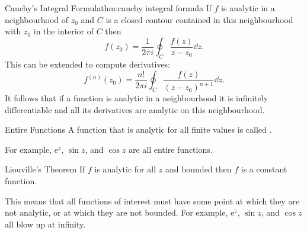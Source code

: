 \documentclass[fleqn]{NotesClass}
\newcommand*{\e}{\mathrm{e}}
\begin{document}
    \begin{thm}{Cauchy's Integral Formula}{thm:cauchy integral formula}
        If \(f\) is analytic in a neighbourhood of \(z_0\) and \(C\) is a closed contour contained in this neighbourhood with \(z_0\) in the interior of \(C\) then
        \begin{equation}
            f(z_0) = \frac{1}{2\pi i} \oint_C \frac{f(z)}{z - z_0}\dd{z}.
        \end{equation}
        This can be extended to compute derivatives:
        \begin{equation}
            f^{(n)}(z_0) = \frac{n!}{2\pi i} \oint_C \frac{f(z)}{(z - z_0)^{n+1}}\dd{z}.
        \end{equation}
        It follows that if a function is analytic in a neighbourhood it is infinitely differentiable and all its derivatives are analytic on this neighbourhood.
    \end{thm}
    
    \begin{dfn}{Entire Functions}{}
        A function that is analytic for all finite values is called .
    \end{dfn}
    
    For example, \(\e^z\), \(\sin z\), and \(\cos z\) are all entire functions.
    
    \begin{thm}{Liouville's Theorem}{}
        If \(f\) is analytic for all \(z\) and bounded then \(f\) is a constant function.
    \end{thm}

    This means that all functions of interest must have some point at which they are not analytic, or at which they are not bounded.
    For example, \(\e^z\), \(\sin z\), and \(\cos z\) all blow up at infinity.
    
\end{document}
